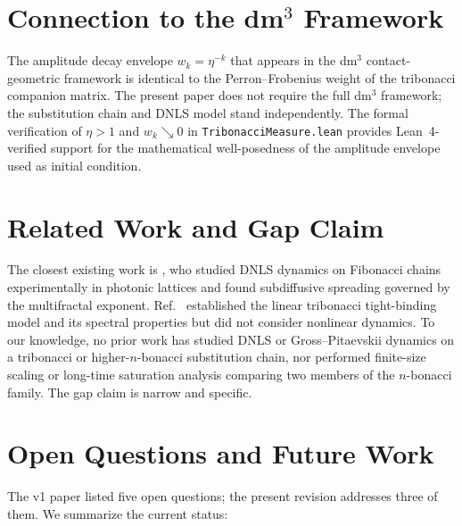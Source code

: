 \documentclass[12pt,a4paper]{article}
\begin{document}
\section{Connection to the dm$^3$ Framework}

The amplitude decay envelope $w_k = \eta^{-k}$ that appears in the dm$^3$
contact-geometric framework \cite{Grossi2026_Vol1,Grossi2026_Wavenumber6}
is identical to the Perron--Frobenius weight of the tribonacci companion
matrix. The present paper does not require the full dm$^3$ framework; the
substitution chain and DNLS model stand independently. The formal
verification of $\eta > 1$ and $w_k \searrow 0$ in
\texttt{TribonacciMeasure.lean} \cite{AXLE2026} provides Lean~4-verified
support for the mathematical well-posedness of the amplitude envelope used
as initial condition.

\section{Related Work and Gap Claim}

The closest existing work is \cite{Lahini2009}, who studied DNLS dynamics
on Fibonacci chains experimentally in photonic lattices and found
subdiffusive spreading governed by the multifractal exponent.
Ref.~\cite{Krebbekx2023} established the linear tribonacci tight-binding
model and its spectral properties but did not consider nonlinear dynamics.
To our knowledge, no prior work has studied DNLS or Gross--Pitaevskii
dynamics on a tribonacci or higher-$n$-bonacci substitution chain, nor
performed finite-size scaling or long-time saturation analysis comparing
two members of the $n$-bonacci family. The gap claim is narrow and
specific.

\section{Open Questions and Future Work}

The v1 paper listed five open questions; the present revision addresses
three of them. We summarize the current status:
\end{document}
